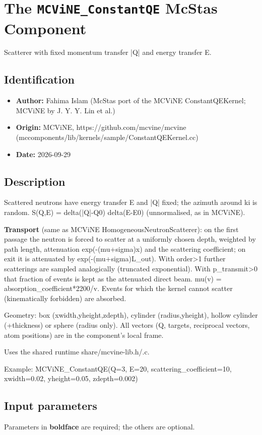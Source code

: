 \section{The \texttt{MCViNE\_ConstantQE} McStas Component}
Scatterer with fixed momentum transfer |Q| and energy transfer E.

\subsection*{Identification}
\begin{itemize}
  \item \textbf{Author:} Fahima Islam (McStas port of the MCViNE ConstantQEKernel; MCViNE by J. Y. Y. Lin et al.)
  \item \textbf{Origin:} MCViNE, https://github.com/mcvine/mcvine (mccomponents/lib/kernels/sample/ConstantQEKernel.cc)
  \item \textbf{Date:} 2026-09-29
\end{itemize}

\subsection*{Description}
Scattered neutrons have energy transfer E and |Q| fixed; the azimuth around ki is random. S(Q,E) = delta(|Q|-Q0) delta(E-E0) (unnormalised, as in MCViNE).

\textbf{Transport} (same as MCViNE HomogeneousNeutronScatterer): on the first passage the neutron is forced to scatter at a uniformly chosen depth, weighted by path length, attenuation exp(-(mu+sigma)x) and the scattering coefficient; on exit it is attenuated by exp(-(mu+sigma)L\_out). With order\textgreater{}1 further scatterings are sampled analogically (truncated exponential). With p\_transmit\textgreater{}0 that fraction of events is kept as the attenuated direct beam. mu(v) = absorption\_coefficient*2200/v. Events for which the kernel cannot scatter (kinematically forbidden) are absorbed.

Geometry: box (xwidth,yheight,zdepth), cylinder (radius,yheight), hollow cylinder (+thickness) or sphere (radius only). All vectors (Q, targets, reciprocal vectors, atom positions) are in the component's local frame.

Uses the shared runtime share/mcvine-lib.h/.c.

Example: MCViNE\_ConstantQE(Q=3, E=20, scattering\_coefficient=10, xwidth=0.02, yheight=0.05, zdepth=0.002)

\subsection*{Input parameters}
Parameters in \textbf{boldface} are required; the others are optional.

